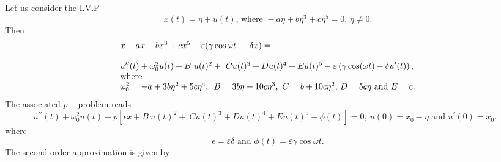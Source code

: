 \documentclass{ws-ijbc}
\begin{document}
  Let us consider the I.V.P     
\begin{equation}
x(t)=\eta +u(t)\text{, where }-a\eta +b\eta ^{3}+c\eta ^{5}=0\text{, }\eta
\neq 0.  \label{k7}
\end{equation}%
Then 
\begin{equation}
\begin{tabular}{l}
$\ddot{x}-ax+bx^{3}+cx^{5}-\varepsilon (\gamma \cos \omega t\ -\delta \dot{x}%
)=$ \\ 
\\ 
$u^{\prime \prime }(t)+\omega
_{0}^{2}u(t)+B~u(t)^{2}+~Cu(t)^{3}+Du(t)^{4}+Eu(t)^{5}-\varepsilon \left(
\gamma \cos (\omega t)-\delta u^{\prime }(t)\right) ,$ \\ 
where \\ 
$\omega _{0}^{2}=-a+3b\eta ^{2}+5c\eta ^{4}$, $\ B=3b\eta +10c\eta
^{3},~C=b+10c\eta ^{2}$, $D=5c\eta $ and $E=c.$%
\end{tabular}
\label{k8}
\end{equation}%
The associated $p-$problem reads%
\begin{equation}
u^{\prime \prime }(t)+\omega _{0}^{2}u(t)+p\left[ \epsilon \dot{x}%
+B~u(t)^{2}+~Cu(t)^{3}+Du(t)^{4}+Eu(t)^{5}-\phi (t)\right]
=0,~u(0)=x_{0}-\eta \text{ and }u^{\prime }(0)=\dot{x}_{0}.\text{ }
\label{k9}
\end{equation}%
where%
\begin{equation}
\epsilon =\varepsilon \delta \text{ and }\phi (t)=\varepsilon \gamma \cos
\omega t.  \label{k10}
\end{equation}%
The second order approximation is given by%
\end{document}
